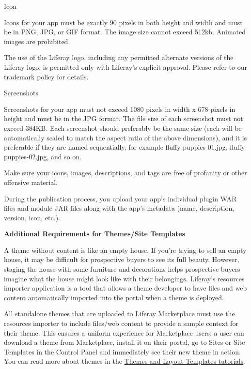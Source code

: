 Icon

Icons for your app must be exactly 90 pixels in both height and width
and must be in PNG, JPG, or GIF format. The image size cannot exceed
512kb. Animated images are prohibited.

The use of the Liferay logo, including any permitted alternate versions
of the Liferay logo, is permitted only with Liferay's explicit approval.
Please refer to our trademark policy for details.

Screenshots

Screenshots for your app must not exceed 1080 pixels in width x 678
pixels in height and must be in the JPG format. The file size of each
screenshot must not exceed 384KB. Each screenshot should preferably be
the same size (each will be automatically scaled to match the aspect
ratio of the above dimensions), and it is preferable if they are named
sequentially, for example fluffy-puppies-01.jpg, fluffy-puppies-02.jpg,
and so on.

Make sure your icons, images, descriptions, and tags are free of
profanity or other offensive material.

During the publication process, you upload your app's individual plugin
WAR files and module JAR files along with the app's metadata (name,
description, version, icon, etc.).

\textbf{Additional Requirements for Themes/Site Templates}

A theme without content is like an empty house. If you're trying to sell
an empty house, it may be difficult for prospective buyers to see its
full beauty. However, staging the house with some furniture and
decorations helps prospective buyers imagine what the house might look
like with their belongings. Liferay's resources importer application is
a tool that allows a theme developer to have files and web content
automatically imported into the portal when a theme is deployed.

All standalone themes that are uploaded to Liferay Marketplace must use
the resources importer to include files/web content to provide a sample
context for their theme. This ensures a uniform experience for
Marketplace users: a user can download a theme from Marketplace, install
it on their portal, go to Sites or Site Templates in the Control Panel
and immediately see their new theme in action. You can read more about
themes in the
\href{/docs/7-0/tutorials/-/knowledge_base/t/themes-and-layout-templates}{Themes
and Layout Templates tutorials}.

